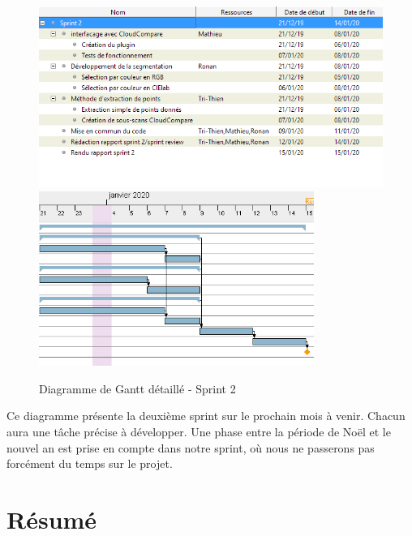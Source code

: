 \documentclass[12pt,titlepage,french]{article}
\begin{document}
\begin{figure}[!hbtp]
  \caption{\label{} Diagramme de Gantt détaillé - Sprint 2}
  \includegraphics[width=1\textwidth]{./img/sprint_iteration_2_tableau.PNG}
  \includegraphics[width=0.8\textwidth]{./img/sprint_iteration_2_diagramme.PNG}
\end{figure}

Ce diagramme présente la deuxième sprint sur le prochain mois à venir. Chacun aura une tâche précise à développer. Une phase entre la période de Noël et le nouvel an est prise en compte dans notre sprint, où nous ne passerons pas forcément du temps sur le projet. 

\section{Résumé}
\end{document}
